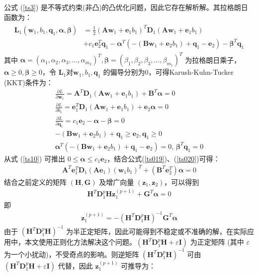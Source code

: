公式 (\ref{ts3}) 是不等式约束(非凸)的凸优化问题，因此它存在解析解。其拉格朗日函数为：
\begin{align}
\begin{split}
	\pmb{L}_1(\mathbf{w}_1,b_1,\mathbf{q}_1,\pmb{\alpha},\pmb{\beta}) &=\frac{1}{2}(\mathbf{Aw}_1+\mathbf{e}_1b_1)^T\mathbf{D}_1(\mathbf{Aw}_1+\mathbf{e}_1b_1)\\
	&+c_1\mathbf{e}_2^T\mathbf{q}_1-\pmb{\alpha}^T(-(\mathbf{Bw}_1+\mathbf{e}_2b_1)+\mathbf{q}_1-\mathbf{e}_2)-\pmb{\beta}^T\mathbf{q}_1
\end{split}
\end{align}
其中 $\pmb{\alpha}=(\alpha_1,\alpha_2,\alpha_3,\ldots,\alpha_{m_2})^T, \pmb{\beta}=(\beta_1,\beta_2,\beta_3,\ldots,\beta_{m_1})^T$ 为拉格朗日乘子，$\pmb{\alpha}\geq 0,\pmb{\beta}\geq 0$，令 $\pmb{L}_1$对$\mathbf{w}_1,b_1,\mathbf{q}_1$ 的偏导分别为0，可得Karush-Kuhn-Tucker (KKT)条件为：
\begin{eqnarray}
    \label{ts019}
	\frac{\partial{L}}{\partial{\mathbf{w}_1}}=\mathbf{A}^T\mathbf{D}_1(\mathbf{Aw}_1+\mathbf{e}_1b_1)+\mathbf{B}^T\pmb{\alpha}=0\\
    \label{ts020}
	\frac{\partial{L}}{\partial{b_1}}=\mathbf{e}_1^T\mathbf{D}_1(\mathbf{Aw}_1+\mathbf{e}_1b_1)+\mathbf{e}_2\pmb{\alpha}=0\\
	\label{ts10}
	\frac{\partial{L}}{\partial{\mathbf{q}_1}}=c_1\mathbf{e}_2-\pmb{\alpha}-\pmb{\beta}=0\\
	-(\mathbf{Bw}_1+\mathbf{e}_2b_1)+\mathbf{q}_1 \geq \mathbf{e}_2, \mathbf{q}_1\geq 0\\
	\pmb{\alpha}^T(-(\mathbf{Bw}_1+\mathbf{e}_2b_1)+\mathbf{q}_1-\mathbf{e}_2)=0,\,\pmb{\beta}^T\mathbf{q}_1=0
\end{eqnarray}
从式 (\ref{ts10}) 可推出 $0\le \pmb{\alpha} \le c_1\mathbf{e}_2$，结合公式(\ref{ts019})、(\ref{ts020})可得：
\begin{align}
	\mathbf{A}^T\mathbf{e}_1^T\mathbf{D}_1(\mathbf{Ae}_1)(\mathbf{w}_1b_1)^T+(\mathbf{B}^T\mathbf{e}_2^T)\pmb{\alpha}=0
\end{align}
结合之前定义的矩阵 $(\mathbf{H,G})$ 及增广向量 $(\mathbf{z}_1,\mathbf{z}_2)$，可以得到
\begin{align}
	\mathbf{H}^T\mathbf{D}_1^p\mathbf{Hz}_1^{(p+1)}+\mathbf{G}^T\pmb{\alpha}=0
\end{align}
即
\begin{align}
\label{ts11}
	\mathbf{z}_1^{(p+1)}=-(\mathbf{H}^T\mathbf{D}_1^p\mathbf{H})^{-1}\mathbf{G}^T\pmb{\alpha}
\end{align}
由于 $(\mathbf{H}^T\mathbf{D}_1^p\mathbf{H})^{-1}$ 为半正定矩阵，因此可能得到不稳定或不准确的解，在实际应用中，本文使用正则化方法解决这个问题。$(\mathbf{H}^T\mathbf{D}_1^p\mathbf{H}+\varepsilon \mathbf{I})$ 为正定矩阵 (其中 $\varepsilon$ 为一个小扰动)，不受奇点的影响。则逆矩阵 $(\mathbf{H}^T\mathbf{D}_1^p\mathbf{H})^{-1}$ 可由 $(\mathbf{H}^T\mathbf{D}_1^p\mathbf{H}+\varepsilon \mathbf{I})$ 代替，因此 $\mathbf{z}_1^{(p+1)}$ 可推导为：
